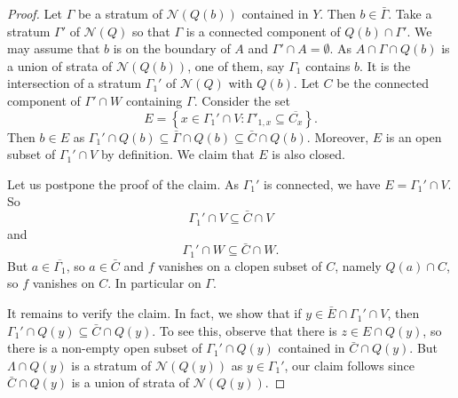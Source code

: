 \begin{proof}
    Let $\Gamma$ be a stratum of $\mathcal{N}(Q(b))$ contained in $Y$. Then $b\in \bar{\Gamma}$. Take a stratum $\Gamma'$ of $\mathcal{N}(Q)$ so that $\Gamma$ is a connected component of $Q(b)\cap \Gamma'$. We may assume that $b$ is on the boundary of $A$ and $\Gamma'\cap A=\emptyset$. As $A\cap \Gamma\cap Q(b)$ is a union of strata of $\mathcal{N}(Q(b))$, one of them, say $\Gamma_1$ contains $b$. It is the intersection of a stratum $\Gamma_1'$ of $\mathcal{N}(Q)$ with $Q(b)$. Let $C$ be the connected component of $\Gamma'\cap W$ containing $\Gamma$. Consider the set
    \[
        E=\left\{ x\in \Gamma_1'\cap V : \Gamma'_{1,x}\subseteq \overline{C_x} \right\}.    
    \]
    Then $b\in E$ as $\Gamma_1'\cap Q(b)\subseteq \bar{\Gamma}\cap Q(b)\subseteq \bar{C}\cap Q(b)$. Moreover, $E$ is an open subset of $\Gamma_1'\cap V$ by definition. We claim that $E$ is also closed. 
    
    Let us postpone the proof of the claim. As $\Gamma_1'$ is connected, we have $E=\Gamma_1'\cap V$. So 
    \[
        \Gamma_1'\cap V\subseteq \bar{C}\cap V  
    \]
    and 
    \[
        \Gamma_1'\cap W\subseteq \bar{C}\cap W.
    \]
    But $a\in \overline{\Gamma_1}$, so $a\in \bar{C}$ and $f$ vanishes on a clopen subset of $C$, namely $Q(a)\cap C$, so $f$ vanishes on $C$. In particular on $\Gamma$.
    
    
    It remains to verify the claim.
    In fact, we show that if $y\in \bar{E}\cap \Gamma_1'\cap V$, then $\Gamma_1'\cap Q(y)\subseteq \bar{C}\cap Q(y)$. To see this, observe that there is $z\in E\cap Q(y)$, so there is a non-empty open subset of $\Gamma_1'\cap Q(y)$ contained in $\bar{C}\cap Q(y)$. But $\Lambda\cap Q(y)$ is a stratum of $\mathcal{N}(Q(y))$ as $y\in \Gamma_1'$, our claim follows since $\bar{C}\cap Q(y)$ is a union of strata of $\mathcal{N}(Q(y))$.
\end{proof}


